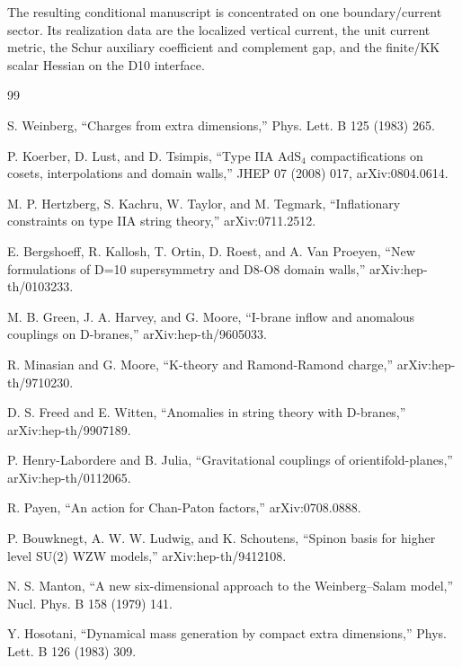 \documentclass[11pt]{article}
\theoremstyle{definition}
\theoremstyle{remark}
\newcommand{\AdS}{\mathrm{AdS}}
\begin{document}
The resulting conditional manuscript is concentrated on one boundary/current
sector.  Its realization data are the localized vertical current, the unit
current metric, the Schur auxiliary coefficient and complement gap, and the
finite/KK scalar Hessian on the D10 interface.

\begingroup
\raggedright
\begin{thebibliography}{99}

S. Weinberg,
``Charges from extra dimensions,''
Phys. Lett. B 125 (1983) 265.

P. Koerber, D. Lust, and D. Tsimpis,
``Type IIA \(\AdS_4\) compactifications on cosets, interpolations and domain
walls,''
JHEP 07 (2008) 017, arXiv:0804.0614.

M. P. Hertzberg, S. Kachru, W. Taylor, and M. Tegmark,
``Inflationary constraints on type IIA string theory,''
arXiv:0711.2512.

E. Bergshoeff, R. Kallosh, T. Ortin, D. Roest, and A. Van Proeyen,
``New formulations of D=10 supersymmetry and D8-O8 domain walls,''
arXiv:hep-th/0103233.

M. B. Green, J. A. Harvey, and G. Moore,
``I-brane inflow and anomalous couplings on D-branes,''
arXiv:hep-th/9605033.

R. Minasian and G. Moore,
``K-theory and Ramond-Ramond charge,''
arXiv:hep-th/9710230.

D. S. Freed and E. Witten,
``Anomalies in string theory with D-branes,''
arXiv:hep-th/9907189.

P. Henry-Labordere and B. Julia,
``Gravitational couplings of orientifold-planes,''
arXiv:hep-th/0112065.

R. Payen,
``An action for Chan-Paton factors,''
arXiv:0708.0888.

P. Bouwknegt, A. W. W. Ludwig, and K. Schoutens,
``Spinon basis for higher level SU(2) WZW models,''
arXiv:hep-th/9412108.

N. S. Manton,
``A new six-dimensional approach to the Weinberg--Salam model,''
Nucl. Phys. B 158 (1979) 141.

Y. Hosotani,
``Dynamical mass generation by compact extra dimensions,''
Phys. Lett. B 126 (1983) 309.


\end{thebibliography}
\end{document}
